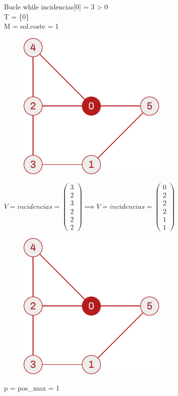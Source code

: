 \documentclass[spanish]{beamer}
\begin{document}
\begin{frame}{Bucle while}
	incidencias[0] = 3 > 0\\
	T = \{0\}\\
	M = sol.coste = 1
	\begin{figure}[H]
		\centering \includegraphics{./img/grafo-ejemplo-1-pres.pdf}
	\end{figure}
\end{frame}

\begin{frame}{}
	$\displaystyle  V = incidencias =
	\begin{pmatrix}
	  3 \\
	  2 \\
	  3 \\
	  2 \\
	  2 \\
	  2
	\end{pmatrix} \implies  V = incidencias =
	\begin{pmatrix}
	  0 \\
	  2 \\
	  2 \\
	  2 \\
	  1 \\
	  1
	\end{pmatrix}$

	\begin{figure}[H]
		\centering \includegraphics{./img/grafo-ejemplo-1-pres.pdf}
	\end{figure}
	p = pos\_max = 1

\end{frame}
\end{document}
